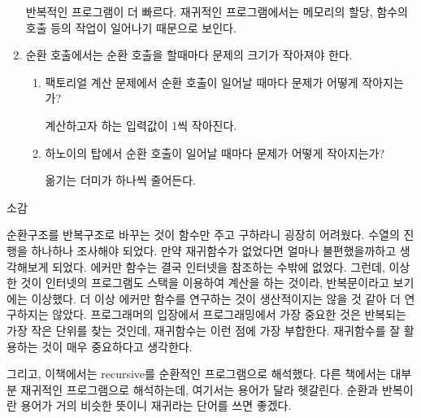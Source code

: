 \documentclass[11pt,a4paper]{article}
\begin{document}
\begin{enumerate}
반복적인 프로그램이 더 빠르다. 재귀적인 프로그램에서는 메모리의 할당, 함수의 호출 등의 작업이 일어나기 때문으로 보인다.

\item 순환 호출에서는 순환 호출을 할때마다 문제의 크기가 작아져야 한다.
\begin{enumerate}
	\item 팩토리얼 계산 문제에서 순환 호출이 일어날 때마다 문제가 어떻게 작아지는가?
	
	계산하고자 하는 입력값이 1씩 작아진다.
	\item 하노이의 탑에서 순환 호출이 일어날 때마다 문제가 어떻게 작아지는가?
	
	옮기는 더미가 하나씩 줄어든다.
\end{enumerate}


\end{enumerate}
\vspace{2cm}
{\Huge 소감}

순환구조를 반복구조로 바꾸는 것이 함수만 주고 구하라니 굉장히 어려웠다. 수열의 진행을 하나하나 조사해야 되었다. 만약 재귀함수가 없었다면 얼마나 불편했을까하고 생각해보게 되었다. 에커만 함수는 결국 인터넷을 참조하는 수밖에 없었다. 그런데, 이상한 것이 인터넷의 프로그램도 스택을 이용하여 계산을 하는 것이라, 반복문이라고 보기에는 이상했다. 더 이상 에커만 함수를 연구하는 것이 생산적이지는 않을 것 같아 더 연구하지는 않았다. 프로그래머의 입장에서 프로그래밍에서 가장 중요한 것은 반복되는 가장 작은 단위를 찾는 것인데, 재귀함수는 이런 점에 가장 부합한다. 재귀함수를 잘 활용하는 것이 매우 중요하다고 생각한다.

그리고, 이책에서는 recursive를 순환적인 프로그램으로 해석했다. 다른 책에서는 대부분 재귀적인 프로그램으로 해석하는데, 여기서는 용어가 달라 헷갈린다. 순환과 반복이란 용어가 거의 비슷한 뜻이니 재귀라는 단어를 쓰면 좋겠다.
\end{document}
